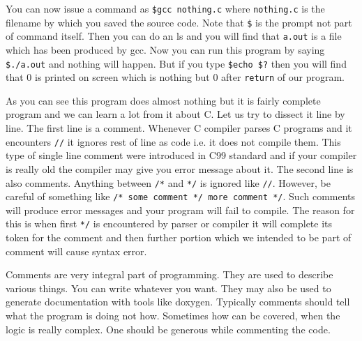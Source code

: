 You can now issue a command as \texttt{\$gcc nothing.c} where 
\texttt{nothing.c} is the filename by which you saved the source code. Note 
that \texttt{\$} is the prompt not part of command itself. Then you can do an 
ls and you will find that \texttt{a.out} is a file which has been produced by 
gcc. Now you can run this program by saying \texttt{\$./a.out} and nothing 
will happen. But if you type \texttt{\$echo \$?} then you will find that 0 is 
printed on screen which is nothing but 0 after \texttt{return} of our program.

As you can see this program does almost nothing but it is fairly complete 
program and we can learn a lot from it about C. Let us try to dissect it line
by line. The first line is a comment. 
Whenever C compiler parses C programs and it encounters \texttt{//} it ignores 
rest of line as code i.e. it does not compile them. This type of single line 
comment were introduced in C99 standard and if your compiler is really old the 
compiler may give you error message about it. The second line is
also comments. Anything between \texttt{/*} and \texttt{*/} is ignored like 
\texttt{//}. However, be careful of something like \texttt{/* some comment */
  more comment */}. Such comments will produce error messages and your program
will fail to compile. The reason for this is when first \texttt{*/} is
encountered by parser or compiler it will complete its token for the comment
and then further portion which we intended to be part of comment will cause
syntax error. 

Comments are very integral part of programming. They are used to describe 
various things. You can write whatever you want. They may also be used to 
generate documentation with tools like doxygen. Typically comments should tell
what the program is doing not how. Sometimes how can be covered, when the logic
is really complex. One should be generous while commenting the code.

